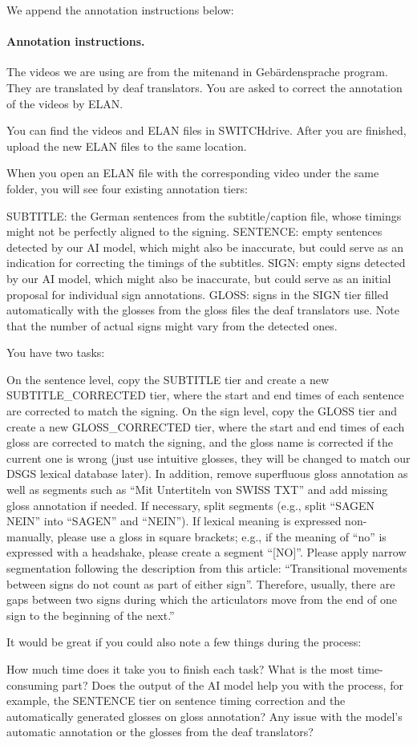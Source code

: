 \documentclass[11pt]{article}
\begin{document}
We append the annotation instructions below:

\paragraph{Annotation instructions.} The videos we are using are from the mitenand in Gebärdensprache program. They are translated by deaf translators. You are asked to correct the annotation of the videos by ELAN.

You can find the videos and ELAN files in SWITCHdrive. After you are finished, upload the new ELAN files to the same location.

When you open an ELAN file with the corresponding video under the same folder, you will see four existing annotation tiers:

SUBTITLE: the German sentences from the subtitle/caption file, whose timings might not be perfectly aligned to the signing.
SENTENCE: empty sentences detected by our AI model, which might also be inaccurate, but could serve as an indication for correcting the timings of the subtitles.
SIGN: empty signs detected by our AI model, which might also be inaccurate, but could serve as an initial proposal for individual sign annotations.
GLOSS: signs in the SIGN tier filled automatically with the glosses from the gloss files the deaf translators use. Note that the number of actual signs might vary from the detected ones.

You have two tasks:

On the sentence level, copy the SUBTITLE tier and create a new SUBTITLE\_CORRECTED tier, where the start and end times of each sentence are corrected to match the signing.
On the sign level, copy the GLOSS tier and create a new GLOSS\_CORRECTED tier, where the start and end times of each gloss are corrected to match the signing, and the gloss name is corrected if the current one is wrong (just use intuitive glosses, they will be changed to match our DSGS lexical database later). In addition, remove superfluous gloss annotation as well as segments such as “Mit Untertiteln von SWISS TXT” and add missing gloss annotation if needed. If necessary, split segments (e.g., split “SAGEN NEIN” into “SAGEN” and “NEIN”). If lexical meaning is expressed non-manually, please use a gloss in square brackets; e.g., if the meaning of “no” is expressed with a headshake, please create a segment “[NO]”. Please apply narrow segmentation following the description from this article: “Transitional movements between signs do not count as part of either sign”. Therefore, usually, there are gaps between two signs during which the articulators move from the end of one sign to the beginning of the next.”

It would be great if you could also note a few things during the process:

How much time does it take you to finish each task? What is the most time-consuming part?
Does the output of the AI model help you with the process, for example, the SENTENCE tier on sentence timing correction and the automatically generated glosses on gloss annotation?
Any issue with the model’s automatic annotation or the glosses from the deaf translators?
\end{document}
